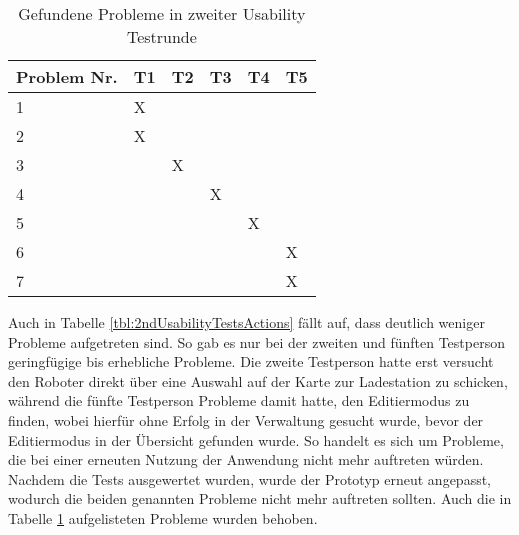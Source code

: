 \begin{table}[H]
    \caption{Gefundene Probleme in zweiter Usability Testrunde}\label{tbl:2ndUsabilityTestsProblems}
    \begin{tabular}{l|l|l|l|l|l}
        Problem Nr. & T1    & T2    & T3    & T4    & T5    \\ \hline
        1           & X     &       &       &       &       \\
        2           & X     &       &       &       &       \\
        3           &       & X     &       &       &       \\
        4           &       &       & X     &       &       \\
        5           &       &       &       & X     &       \\
        6           &       &       &       &       & X     \\
        7           &       &       &       &       & X     \\
    \end{tabular}    
\end{table}

Auch in Tabelle \ref{tbl:2ndUsabilityTestsActions} fällt auf, dass deutlich weniger Probleme aufgetreten sind. So gab es nur bei der zweiten und fünften Testperson geringfügige bis erhebliche Probleme. Die zweite Testperson hatte erst versucht den Roboter direkt über eine Auswahl auf der Karte zur Ladestation zu schicken, während die fünfte Testperson Probleme damit hatte, den Editiermodus zu finden, wobei hierfür ohne Erfolg in der Verwaltung gesucht wurde, bevor der Editiermodus in der Übersicht gefunden wurde. So handelt es sich um Probleme, die bei einer erneuten Nutzung der Anwendung nicht mehr auftreten würden. Nachdem die Tests ausgewertet wurden, wurde der Prototyp erneut angepasst, wodurch die beiden genannten Probleme nicht mehr auftreten sollten. Auch die in Tabelle \ref{tbl:2ndUsabilityTestsProblems} aufgelisteten Probleme wurden behoben.

